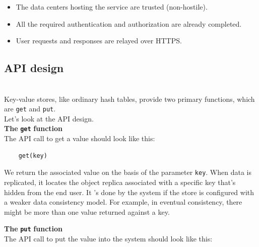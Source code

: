 \begin{itemize}
\item
\protect{}\label{z0xL0yqAuFT3IPtof776g}
The data centers hosting the service are trusted (non-hostile).
\item
\protect{}\label{vrPgmWkqrYo0vnMMjYB1y}
All the required authentication and authorization are already completed.
\item
\protect{}\label{I5_3M9uuEU4pPx1fV7p_V}
User requests and responses are relayed over HTTPS.
\end{itemize}

\subsection{API design}\label{OLL9LcibwHUkH5Nx63fS3}
\\
Key-value stores, like ordinary hash tables, provide two primary functions, which are \texttt{get} and \texttt{put}.
\\
Let's look at the API design.
\\
\textbf{The} \textbf{\texttt{get}} \textbf{function}
\\
The API call to get a value should look like this:

\begin{verbatim}
	get(key)
\end{verbatim}


We return the associated value on the basis of the parameter \texttt{key}. When data is replicated, it locates the object replica associated with a specific key that's hidden from the end user. It 's done by the system if the store is configured with a weaker data consistency model. For example, in eventual consistency, there might be more than one value returned against a key.

\begin{table}[htbp]
\centering
\small
{}
\end{table}

\textbf{The} \textbf{\texttt{put}} \textbf{function}
\\
The API call to put the value into the system should look like this:

